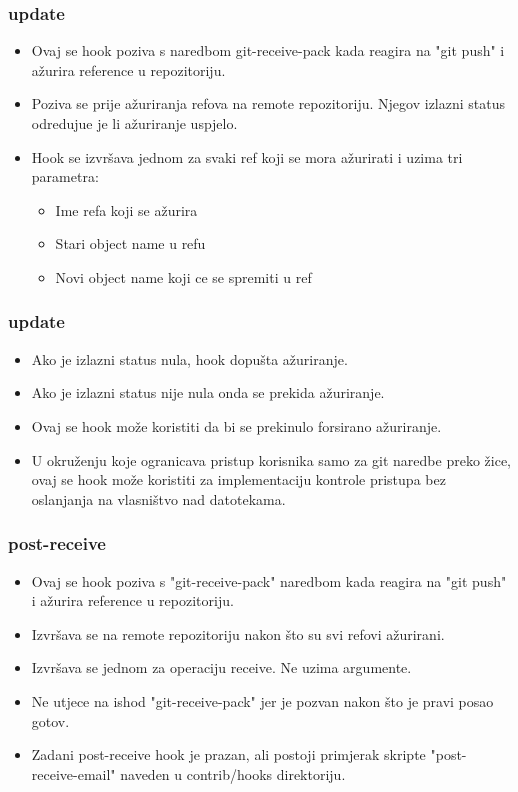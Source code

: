 \documentclass{beamer}
\begin{document}
\begin{frame}
\frametitle{update}
\begin{itemize}
    \item Ovaj se hook poziva s naredbom git-receive-pack kada reagira na "git push" i ažurira reference u repozitoriju.
    \item Poziva se prije ažuriranja refova na remote repozitoriju. Njegov izlazni status odredujue je li ažuriranje uspjelo.
    \item Hook se izvršava jednom za svaki ref koji se mora ažurirati i uzima tri parametra:
    \begin{itemize}
        \item Ime refa koji se ažurira
        \item Stari object name u refu
        \item Novi object name koji ce se spremiti u ref
    \end{itemize}
\end{itemize}
\end{frame}   
\begin{frame}
\frametitle{update}
\begin{itemize}
    \item Ako je izlazni status nula, hook dopušta ažuriranje.
    \item Ako je izlazni status nije nula onda se prekida ažuriranje.
    \item Ovaj se hook može koristiti da bi se prekinulo forsirano ažuriranje.
    \item U okruženju koje ogranicava pristup korisnika samo za git naredbe preko žice, ovaj se hook može koristiti za implementaciju kontrole pristupa bez oslanjanja na vlasništvo nad datotekama.
\end{itemize}
\end{frame}

\begin{frame}
\frametitle{post-receive}
\begin{itemize}
    \item Ovaj se hook poziva s "git-receive-pack" naredbom kada reagira na "git push" i ažurira reference u repozitoriju.
    \item Izvršava se na remote repozitoriju nakon što su svi refovi ažurirani.
    \item Izvršava se jednom za operaciju receive. Ne uzima argumente.
    \item Ne utjece na ishod "git-receive-pack" jer je pozvan nakon što je pravi posao gotov.
    \item Zadani post-receive hook je prazan, ali postoji primjerak skripte "post-receive-email" naveden u contrib/hooks direktoriju.

\end{itemize}
\end{frame}
\end{document}
